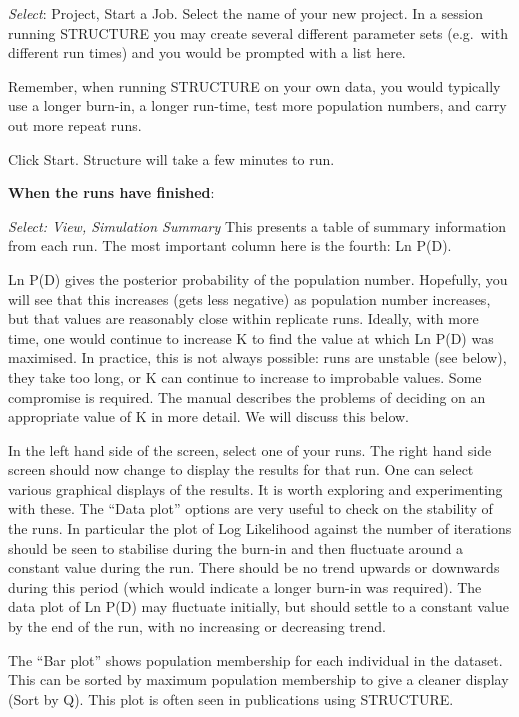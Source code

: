 \documentclass[
]{book}
\begin{document}
\emph{Select}: Project, Start a Job. Select the name of your new project. In a session running STRUCTURE you may create several different parameter sets (e.g.~with different run times) and you would be prompted with a list here.

Remember, when running STRUCTURE on your own data, you would typically use a longer burn-in, a longer run-time, test more population numbers, and carry out more repeat runs.

Click Start. Structure will take a few minutes to run.

\textbf{When the runs have finished}:

\emph{Select: View, Simulation Summary} This presents a table of summary information from each run. The most important column here is the fourth: Ln P(D).

Ln P(D) gives the posterior probability of the population number. Hopefully, you will see that this increases (gets less negative) as population number increases, but that values are reasonably close within replicate runs. Ideally, with more time, one would continue to increase K to find the value at which Ln P(D) was maximised. In practice, this is not always possible: runs are unstable (see below), they take too long, or K can continue to increase to improbable values. Some compromise is required. The manual describes the problems of deciding on an appropriate value of K in more detail. We will discuss this below.

In the left hand side of the screen, select one of your runs. The right hand side screen should now change to display the results for that run. One can select various graphical displays of the results. It is worth exploring and experimenting with these. The ``Data plot'' options are very useful to check on the stability of the runs. In particular the plot of Log Likelihood against the number of iterations should be seen to stabilise during the burn-in and then fluctuate around a constant value during the run. There should be no trend upwards or downwards during this period (which would indicate a longer burn-in was required). The data plot of Ln P(D) may fluctuate initially, but should settle to a constant value by the end of the run, with no increasing or decreasing trend.

The ``Bar plot'' shows population membership for each individual in the dataset. This can be sorted by maximum population membership to give a cleaner display (Sort by Q). This plot is often seen in publications using STRUCTURE.
\end{document}
